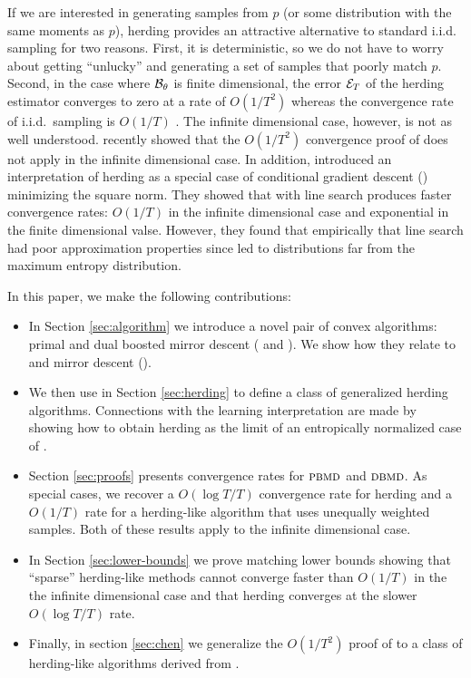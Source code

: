 \documentclass[paper.tex]{subfiles}
\begin{document}
If we are interested in generating samples from $p$ (or some distribution with the same moments as $p$), herding provides an attractive alternative to standard i.i.d. sampling for two reasons. First, it is deterministic, so we do not have to worry about getting ``unlucky'' and generating a set of samples that poorly match $p$. Second, in the case where $\mathcal{B}_{\theta}$ is finite dimensional, the error $\mathcal{E}_{T}$ of the herding estimator converges to zero at a rate of $O(1/T^{2})$ whereas the convergence rate of i.i.d.~sampling is $O(1/T)$ \citep{Chen:2010a}. The infinite dimensional case, however, is not as well understood. \citet{Bach:2012a} recently showed that the $O(1/T^{2})$ convergence proof of \citet{Chen:2010a} does not apply in the infinite dimensional case. In addition, \citet{Bach:2012a} introduced an interpretation of herding as a special case of conditional gradient descent () minimizing the square norm. They showed that  with line search produces faster convergence rates: $O(1/T)$ in the infinite dimensional case and exponential in the finite dimensional valse. However, they found that empirically that line search had poor approximation properties since led to distributions far from the maximum entropy distribution. 

In this paper, we make the following contributions:
\begin{itemize}
\item In Section \ref{sec:algorithm} we introduce a novel pair of convex algorithms: primal and dual boosted mirror descent ( and ). We show how they relate to  and mirror descent (). 
\item We then use  in Section \ref{sec:herding} to define a class of generalized herding algorithms. Connections with the learning interpretation are made by showing how to obtain herding as the limit of an entropically normalized case of . 
\item Section \ref{sec:proofs} presents convergence rates for $\algname{PBMD}$ and $\algname{DBMD}$. As special cases, we recover a $O(\log T/ T)$ convergence rate for herding and a $O(1/T)$ rate for a herding-like algorithm that uses unequally weighted samples. Both of these results apply to the infinite dimensional case. 
\item In Section \ref{sec:lower-bounds} we prove matching lower bounds  showing that ``sparse'' herding-like methods cannot converge faster than $O(1/T)$ in the the infinite dimensional case and that herding converges at the slower $O(\log T / T)$ rate.
\item Finally, in section \ref{sec:chen} we generalize the $O(1/T^{2})$ proof of \citet{Chen:2010a} to a class of herding-like algorithms derived from . 
\end{itemize}
\end{document}
